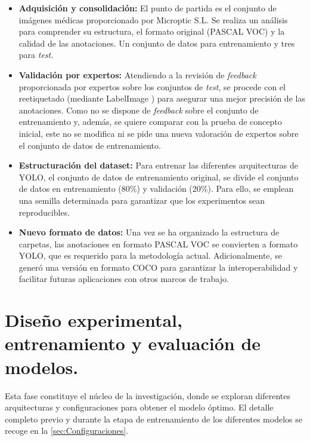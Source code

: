 \documentclass[12pt,a4paper,onecolumn,oneside]{report}
\begin{document}
\begin{itemize}
  \item \textbf{Adquisición y consolidación:} El punto de partida es el conjunto de imágenes médicas proporcionado por Microptic S.L. \cite{microptic} 
  Se realiza un análisis para comprender su estructura, el formato original (PASCAL VOC) y la calidad de las anotaciones. Un conjunto de datos para entrenamiento y tres para \textit{test}.
  \item \textbf{Validación por expertos:} Atendiendo a la revisión de \textit{feedback} proporcionada por expertos sobre los conjuntos de \textit{test}, se procede con el reetiquetado (mediante LabelImage \cite{labelimg_github}) para asegurar una mejor precisión de las anotaciones. 
  Como no se dispone de \textit{feedback} sobre el conjunto de entrenamiento y, además, se quiere comparar con la prueba de concepto inicial, este no se modifica ni se pide una nueva valoración de expertos sobre el conjunto de datos de entrenamiento.
  \item \textbf{Estructuración del dataset:} Para entrenar las diferentes arquitecturas de YOLO, el conjunto de datos de entrenamiento original, se divide el conjunto de datos en entrenamiento (80\%) y validación (20\%). Para ello, se emplean una semilla determinada para garantizar que los experimentos sean reproducibles. 
  \item \textbf{Nuevo formato de datos:} Una vez se ha organizado la estructura de carpetas, las anotaciones en formato PASCAL VOC se convierten a formato YOLO, que es requerido para la metodología actual. Adicionalmente, se generó una versión en formato COCO para garantizar la interoperabilidad y facilitar futuras aplicaciones con otros marcos de trabajo.
\end{itemize}

\section{Diseño experimental, entrenamiento y evaluación de modelos.}
\label{Entrenamiento, validación y evaluación de modelos YOLO}

Esta fase constituye el núcleo de la investigación, donde se exploran diferentes arquitecturas y configuraciones para obtener el modelo óptimo.
El detalle completo previo y durante la etapa de entrenamiento de los diferentes modelos se recoge en la \autoref{sec:Configuraciones}.
\end{document}
